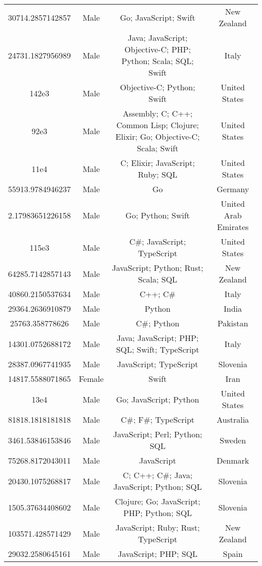 \begin{center}
\begin{tabular}{ |c|c|c|c| }
30714.2857142857  &  Male  &  Go; JavaScript; Swift  &  New Zealand  \\ 
24731.1827956989  &  Male  &  Java; JavaScript; Objective-C; PHP; Python; Scala; SQL; Swift  &  Italy  \\ 
142e3  &  Male  &  Objective-C; Python; Swift  &  United States  \\ 
92e3  &  Male  &  Assembly; C; C++; Common Lisp; Clojure; Elixir; Go; Objective-C; Scala; Swift  &  United States  \\ 
11e4  &  Male  &  C; Elixir; JavaScript; Ruby; SQL  &  United States  \\ 
55913.9784946237  &  Male  &  Go  &  Germany  \\ 
2.17983651226158  &  Male  &  Go; Python; Swift  &  United Arab Emirates  \\ 
115e3  &  Male  &  C\#; JavaScript; TypeScript  &  United States  \\ 
64285.7142857143  &  Male  &  JavaScript; Python; Rust; Scala; SQL  &  New Zealand  \\ 
40860.2150537634  &  Male  &  C++; C\#  &  Italy  \\ 
29364.2636910879  &  Male  &  Python  &  India  \\ 
25763.358778626  &  Male  &  C\#; Python  &  Pakistan  \\ 
14301.0752688172  &  Male  &  Java; JavaScript; PHP; SQL; Swift; TypeScript  &  Italy  \\ 
28387.0967741935  &  Male  &  JavaScript; TypeScript  &  Slovenia  \\ 
14817.5588071865  &  Female  &  Swift  &  Iran  \\ 
13e4  &  Male  &  Go; JavaScript; Python  &  United States  \\ 
81818.1818181818  &  Male  &  C\#; F\#; TypeScript  &  Australia  \\ 
3461.53846153846  &  Male  &  JavaScript; Perl; Python; SQL  &  Sweden  \\ 
75268.8172043011  &  Male  &  JavaScript  &  Denmark  \\ 
20430.1075268817  &  Male  &  C; C++; C\#; Java; JavaScript; Python; SQL  &  Slovenia  \\ 
1505.37634408602  &  Male  &  Clojure; Go; JavaScript; PHP; Python; SQL  &  Slovenia  \\ 
103571.428571429  &  Male  &  JavaScript; Ruby; Rust; TypeScript  &  New Zealand  \\ 
29032.2580645161  &  Male  &  JavaScript; PHP; SQL  &  Spain  \\ 

\end{tabular}
\end{center}

